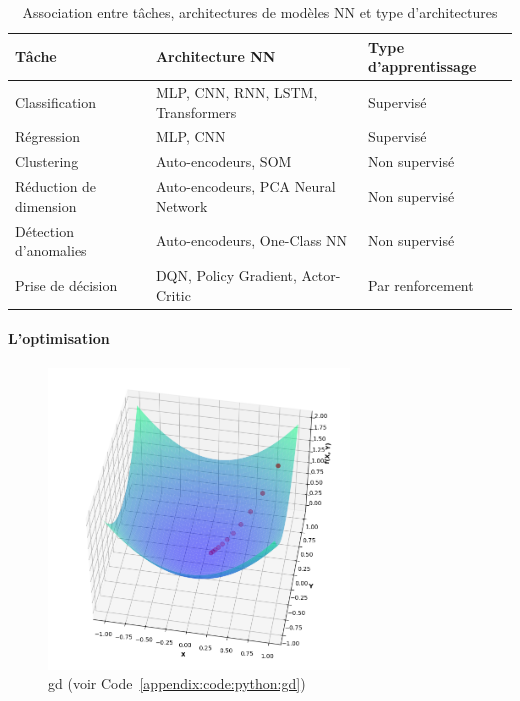 \begin{table}[h]
\centering
\begin{tabular}{|l|l|l|}
\hline
\textbf{Tâche}                   & \textbf{Architecture NN}                     & \textbf{Type d'apprentissage}   \\ \hline
Classification          & MLP, CNN, RNN, LSTM, Transformers   & Supervisé                \\ \hline
Régression              & MLP, CNN                              & Supervisé                \\ \hline
Clustering              & Auto-encodeurs, SOM                  & Non supervisé            \\ \hline
Réduction de dimension  & Auto-encodeurs, PCA Neural Network   & Non supervisé            \\ \hline
Détection d'anomalies   & Auto-encodeurs, One-Class NN         & Non supervisé            \\ \hline
Prise de décision       & DQN, Policy Gradient, Actor-Critic   & Par renforcement         \\ \hline
\end{tabular}
\caption{Association entre tâches, architectures de modèles NN et type d'architectures}
\label{tab:my-table}
\end{table}

\newpage
\paragraph{L'optimisation} \hspace{0pt}

\begin{figure}[H]
    \centering
    \includegraphics[width=8cm]{gfx/fig-gradient-descent.png}
    \caption{\acf{gd} (voir Code~\ref{appendix:code:python:gd})}
    \label{fig:gradient-descent}
\end{figure}

